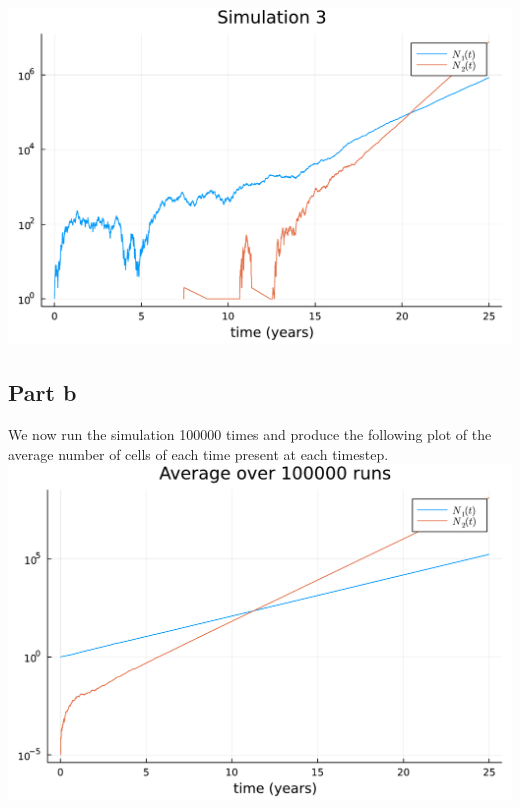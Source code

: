 \documentclass{article}
\begin{document}
\includegraphics[scale=0.5]{sim3.pdf}

\subsection{Part b}
We now run the simulation 100000 times and produce the following plot of the average number of cells of each time present at each timestep.\\
\includegraphics[scale=0.5]{avg.pdf}
\end{document}
